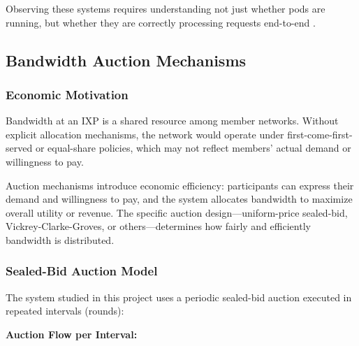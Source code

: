 Observing these systems requires understanding not just whether pods are running, but whether they are correctly processing requests end-to-end \citep{majorsObservabilityEngineering2022}.

\subsection{Bandwidth Auction Mechanisms}

\subsubsection{Economic Motivation}

Bandwidth at an IXP is a shared resource among member networks. Without explicit allocation mechanisms, the network would operate under first-come-first-served or equal-share policies, which may not reflect members' actual demand or willingness to pay.

Auction mechanisms introduce economic efficiency: participants can express their demand and willingness to pay, and the system allocates bandwidth to maximize overall utility or revenue. The specific auction design---uniform-price sealed-bid, Vickrey-Clarke-Groves, or others---determines how fairly and efficiently bandwidth is distributed.

\subsubsection{Sealed-Bid Auction Model}

The system studied in this project uses a periodic sealed-bid auction executed in repeated intervals (rounds):

\textbf{Auction Flow per Interval:}

